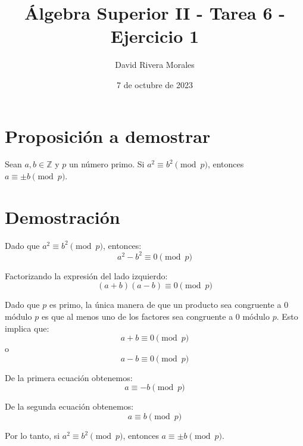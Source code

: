\documentclass{article}
\begin{document}
\title{Álgebra Superior II - Tarea 6 - Ejercicio 1}
\author{David Rivera Morales}
\date{7 de octubre de 2023}

\maketitle

\section*{Proposición a demostrar}
Sean \( a, b \in \mathbb{Z} \) y \( p \) un número primo. Si \( a^2 \equiv b^2 \pmod{p} \), entonces \( a \equiv \pm b \pmod{p} \).

\section*{Demostración}

Dado que \( a^2 \equiv b^2 \pmod{p} \), entonces:
\[ a^2 - b^2 \equiv 0 \pmod{p} \]

Factorizando la expresión del lado izquierdo:
\[ (a + b)(a - b) \equiv 0 \pmod{p} \]

Dado que \( p \) es primo, la única manera de que un producto sea congruente a 0 módulo \( p \) es que al menos uno de los factores sea congruente a 0 módulo \( p \). Esto implica que:
\[ a + b \equiv 0 \pmod{p} \]
o
\[ a - b \equiv 0 \pmod{p} \]

De la primera ecuación obtenemos:
\[ a \equiv -b \pmod{p} \]

De la segunda ecuación obtenemos:
\[ a \equiv b \pmod{p} \]

Por lo tanto, si \( a^2 \equiv b^2 \pmod{p} \), entonces \( a \equiv \pm b \pmod{p} \).
\end{document}
